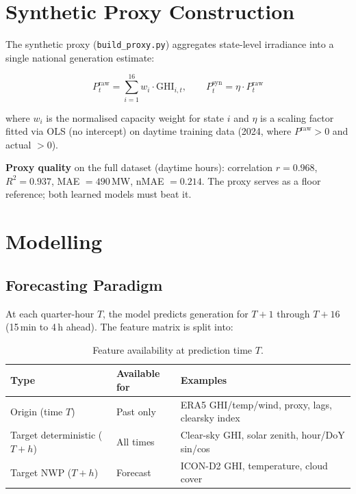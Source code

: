 \documentclass[11pt,a4paper]{article}
\begin{document}
\section{Synthetic Proxy Construction}

The synthetic proxy (\texttt{build\_proxy.py}) aggregates state-level irradiance into a single national generation estimate:

\begin{equation}
P^{\text{raw}}_t = \sum_{i=1}^{16} w_i \cdot \text{GHI}_{i,t}, \qquad
P^{\text{syn}}_t = \eta \cdot P^{\text{raw}}_t
\end{equation}

where $w_i$ is the normalised capacity weight for state $i$ and $\eta$ is a scaling factor fitted via OLS (no intercept) on daytime training data (2024, where $P^{\text{raw}} > 0$ and actual $> 0$).

\textbf{Proxy quality} on the full dataset (daytime hours):
correlation $r = 0.968$, $R^2 = 0.937$, MAE $= 490$\,MW, nMAE $= 0.214$.
The proxy serves as a floor reference; both learned models must beat it.

\section{Modelling}

\subsection{Forecasting Paradigm}

At each quarter-hour $T$, the model predicts generation for $T{+}1$ through $T{+}16$ (15\,min to 4\,h ahead).  The feature matrix is split into:

\begin{table}[H]
\centering
\caption{Feature availability at prediction time $T$.}\label{tab:features}
\small
\begin{tabular}{@{}lll@{}}
\toprule
Type & Available for & Examples \\
\midrule
Origin (time $T$) & Past only & ERA5 GHI/temp/wind, proxy, lags, clearsky index \\
Target deterministic ($T{+}h$) & All times & Clear-sky GHI, solar zenith, hour/DoY sin/cos \\
Target NWP ($T{+}h$) & Forecast & ICON-D2 GHI, temperature, cloud cover \\
\bottomrule
\end{tabular}
\end{table}
\end{document}
